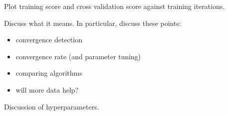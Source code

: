 \newpage

Plot training score and cross validation score against training
iterations.

Discuss what it means.  In particular, discuss these points:
\begin{itemize}
\item convergence detection
\item convergence rate (and parameter tuning)
\item comparing algorithms
\item will more data help?
\end{itemize}


Discussion of hyperparameters.



